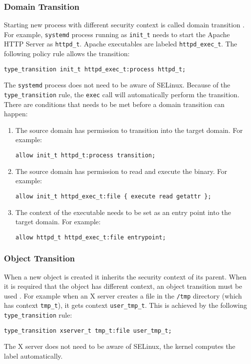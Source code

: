 \subsubsection{Domain Transition}
Starting new process with different security context is called domain transition
\cite[pp.~43--47]{tsn}. For example, \texttt{systemd} process running as
\texttt{init\_t} needs to start the Apache HTTP Server as \texttt{httpd\_t}.
Apache executables are labeled \texttt{httpd\_exec\_t}. The following policy
rule allows the transition:
\begin{lstlisting}[language=te]
type_transition init_t httpd_exec_t:process httpd_t;
\end{lstlisting}
The \texttt{systemd} process does not need to be aware of SELinux. Because of
the \texttt{type\_transition} rule, the \texttt{exec} call will automatically
perform the transition. There are conditions that needs to be met before a
domain transition can happen:
\begin{enumerate}
    \item The source domain has permission to transition into the target domain.
        For example:
\begin{lstlisting}[language=te]
allow init_t httpd_t:process transition;
\end{lstlisting}
    \item The source domain has permission to read and execute the binary. For
        example:
\begin{lstlisting}[language=te]
allow init_t httpd_exec_t:file { execute read getattr };
\end{lstlisting}
    \item The context of the executable needs to be set as an entry point into
        the target domain. For example:
\begin{lstlisting}[language=te]
allow httpd_t httpd_exec_t:file entrypoint;
\end{lstlisting}
\end{enumerate}

\subsubsection{Object Transition}
When a new object is created it inherits the security context of its parent.
When it is required that the object has different context, an object transition
must be used \cite[pp.~47--48]{tsn}. For example when an X server creates a file
in the \texttt{/tmp} directory (which has context \texttt{tmp\_t}), it gets
context \texttt{user\_tmp\_t}. This is achieved by the following
\texttt{type\_transition} rule:
\begin{lstlisting}[language=te]
type_transition xserver_t tmp_t:file user_tmp_t;
\end{lstlisting}
The X server does not need to be aware of SELinux, the kernel computes the label
automatically.

